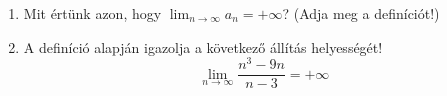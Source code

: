 \documentclass[11pt]{scrartcl}
\begin{document}
\begin{enumerate}
	\item Mit értünk azon, hogy $\lim_{n \to \infty} a_n = +\infty$? (Adja meg a
	      definíciót!)

	\item A definíció alapján igazolja a következő állítás helyességét!
	      \[
		      \lim_{n \to \infty} \frac{n^3 - 9n}{n - 3} = +\infty
	      \]
\end{enumerate}
\end{document}
